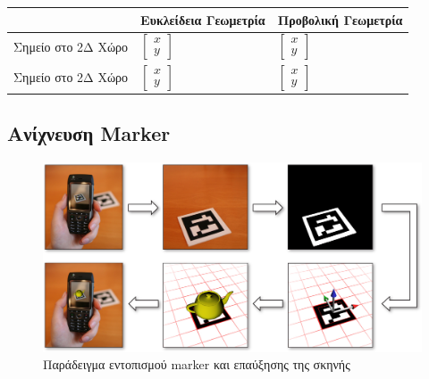 \begin{tabu} to 0.9\textwidth { | X[l] | X[c,m] | X[c,m] | }
   \hline
    & Ευκλείδεια Γεωμετρία & Προβολική Γεωμετρία \\[0.5cm]
   \hline
   Σημείο στο 2Δ Χώρο  & $\begin{bmatrix} x \\ y\end{bmatrix}$  & $\begin{bmatrix} x \\ y\end{bmatrix}$  \\[1cm]
   \hline
   Σημείο στο 2Δ Χώρο  & $\begin{bmatrix} x \\ y\end{bmatrix}$  & $\begin{bmatrix} x \\ y\end{bmatrix}$  \\[1cm]
   \hline
\end{tabu}



\subsection{Ανίχνευση Marker}



\begin{figure}[H]
    \centering
    \includegraphics[scale=0.6, angle=0]{Files/Figures/HowMarkersWork.jpg}
    \caption[Παράδειγμα εντοπισμού marker και επαύξησης της σκηνής \cite{howmarkerswork}]{ Παράδειγμα εντοπισμού marker και επαύξησης της σκηνής \cite{howmarkerswork}}
    \label{fig:howmarkerswork}
\end{figure}


